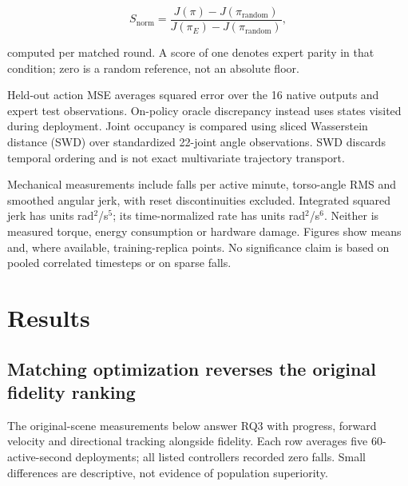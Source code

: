 \documentclass[conference]{IEEEtran}
\begin{document}
\[
S_{\mathrm{norm}}=\frac{J(\pi)-J(\pi_{\mathrm{random}})}
{J(\pi_E)-J(\pi_{\mathrm{random}})},
\]

computed per matched round. A score of one denotes expert parity in that condition; zero is a random reference, not an absolute floor.

Held-out action MSE averages squared error over the 16 native outputs and expert test observations. On-policy oracle discrepancy instead uses states visited during deployment. Joint occupancy is compared using sliced Wasserstein distance (SWD) over standardized 22-joint angle observations. SWD discards temporal ordering and is not exact multivariate trajectory transport.

Mechanical measurements include falls per active minute, torso-angle RMS and smoothed angular jerk, with reset discontinuities excluded. Integrated squared jerk has units rad$^2$/s$^5$; its time-normalized rate has units rad$^2$/s$^6$. Neither is measured torque, energy consumption or hardware damage. Figures show means and, where available, training-replica points. No significance claim is based on pooled correlated timesteps or on sparse falls.

\section{Results}

\subsection{Matching optimization reverses the original fidelity ranking}

The original-scene measurements below answer RQ3 with progress, forward velocity and directional tracking alongside fidelity. Each row averages five 60-active-second deployments; all listed controllers recorded zero falls. Small differences are descriptive, not evidence of population superiority.
\end{document}

